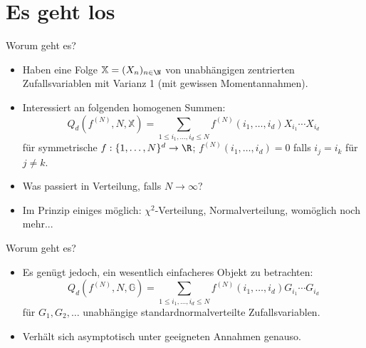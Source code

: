 \section{Es geht los}

\begin{frame}{Worum geht es?}
    \begin{itemize}
    \item Haben eine Folge $\mathbb{X} = (X_n)_{n \in \N}$ von unabhängigen zentrierten Zufallsvariablen mit Varianz 1 (mit gewissen Momentannahmen).  
    \item Interessiert an folgenden homogenen Summen: \[
    Q_d(f^{(N)}, N, \mathbb{X}) = \sum_{1 \leq i_1, \ldots, i_d \leq  N} f^{(N)}(i_1, \ldots, i_d) X_{i_1} \cdots X_{i_d}\]
    für symmetrische $f: \{1, \ldots, N\}^d \to \R$; $f^{(N)}(i_1, \ldots, i_d) = 0$ falls $i_j = i_k$ für $j \neq k$.
    \pause
    \item Was passiert in Verteilung, falls $N \to \infty$? 
    \item Im Prinzip einiges möglich: $\chi^2$-Verteilung, Normalverteilung, womöglich noch mehr...
    \end{itemize}
\end{frame}

\begin{frame}{Worum geht es?}
    \begin{itemize}
        \item Es genügt jedoch, ein wesentlich einfacheres Objekt zu betrachten: \[
        Q_d(f^{(N)}, N, \mathbb{G}) = \sum_{1 \leq i_1, \ldots, i_d \leq  N} f^{(N)}(i_1, \ldots, i_d) G_{i_1} \cdots G_{i_d}\]
        für $G_1, G_2, \ldots$ unabhängige standardnormalverteilte Zufallsvariablen.
        \pause
        \item Verhält sich asymptotisch unter geeigneten Annahmen genauso.
    \end{itemize}
\end{frame}

